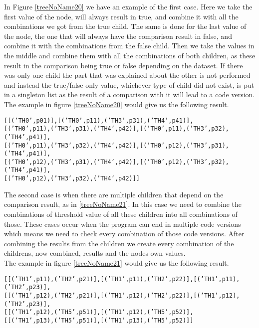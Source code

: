 In Figure \ref{treeNoName20} we have an example of the first case. Here we take the first
value of the node, will always result in true, and combine it with all
the combinations we got from the true child. The same is done for the last value of
the node, the one that will always have the comparison result in false, and combine it with
the combinations from the false child. Then we take the values in the middle
and combine them with all the combinations of both children, as these result in
the comparison being true or false depending on the dataset. If there was only
one child the part that was explained about the other is not performed and
instead the true/false only value, whichever type of child did not exist, is
put in a singleton list as the result of a comparison with it  will lead to a
code version.\\
The example in figure \ref{treeNoName20} would give us the following result.\vspace{1em}

{\centering
  \texttt{[[('TH0',p01)],[('TH0',p11),('TH3',p31),('TH4',p41)],}\\
  \texttt{[('TH0',p11),('TH3',p31),('TH4',p42)],[('TH0',p11),('TH3',p32),('TH4',p41)],}\\
  \texttt{[('TH0',p11),('TH3',p32),('TH4',p42)],[('TH0',p12),('TH3',p31),('TH4',p41)],}\\
  \texttt{[('TH0',p12),('TH3',p31),('TH4',p42)],[('TH0',p12),('TH3',p32),('TH4',p41)],}\\
  \hspace{10em}\texttt{[('TH0',p12),('TH3',p32),('TH4',p42)]]}
}
\vspace{1em}

The second case is when 
there are multiple children that depend on the comparison result, as in
\ref{treeNoName21}. In this case we need to combine the combinations of
threshold value of all these children into all combinations of those. These cases
occur when the program can end in multiple code versions which means we need to check
every combination of those code versions. After combining the results from the
children we create every combination of the childrens, now combined, results
and the nodes own values. \\
The example in figure \ref{treeNoName21} would give us the following result.\vspace{1em}

{\centering
  \texttt{[[('TH1',p11),('TH2',p21)],[('TH1',p11),('TH2',p22)],[('TH1',p11),('TH2',p23)],}\\
  \texttt{[[('TH1',p12),('TH2',p21)],[('TH1',p12),('TH2',p22)],[('TH1',p12),('TH2',p23)],}\\
  \texttt{[[('TH1',p12),('TH5',p51)],[('TH1',p12),('TH5',p52)],}\\
  \texttt{[[('TH1',p13),('TH5',p51)],[('TH1',p13),('TH5',p52)]]}\\
}


